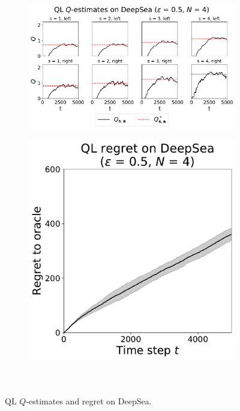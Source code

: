 \documentclass{article}
\begin{document}
\begin{appendices}
\begin{figure}[h!]
\centering
\begin{subfigure}{0.65\textwidth}
\includegraphics[width=\linewidth]{img/ql-0_5-qestimates-deepsea-4.pdf}
\end{subfigure}
\begin{subfigure}{0.34\textwidth}
\includegraphics[width=\linewidth]{img/ql-0_5-regret-deepsea-4.pdf}~\\~\\
\end{subfigure}
\captionsetup{width=0.9\linewidth}
\caption{QL $Q$-estimates and regret on DeepSea.}\label{ql_deepsea_visual}
\end{figure}


\end{appendices}
\end{document}
